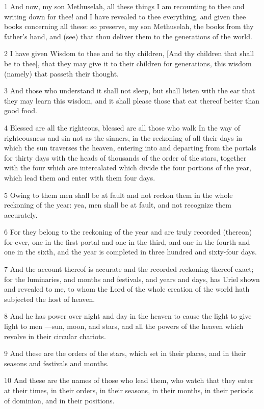\par 1 And now, my son Methuselah, all these things I am recounting to thee and writing down for thee! and I have revealed to thee everything, and given thee books concerning all these: so preserve, my son Methuselah, the books from thy father's hand, and (see) that thou deliver them to the generations of the world.
\par 2 I have given Wisdom to thee and to thy children, [And thy children that shall be to thee], that they may give it to their children for generations, this wisdom (namely) that passeth their thought.
\par 3 And those who understand it shall not sleep, but shall listen with the ear that they may learn this wisdom, and it shall please those that eat thereof better than good food.
\par 4 Blessed are all the righteous, blessed are all those who walk In the way of righteousness and sin not as the sinners, in the reckoning of all their days in which the sun traverses the heaven, entering into and departing from the portals for thirty days with the heads of thousands of the order of the stars, together with the four which are intercalated which divide the four portions of the year, which lead them and enter with them four days.
\par 5 Owing to them men shall be at fault and not reckon them in the whole reckoning of the year: yea, men shall be at fault, and not recognize them accurately.
\par 6 For they belong to the reckoning of the year and are truly recorded (thereon) for ever, one in the first portal and one in the third, and one in the fourth and one in the sixth, and the year is completed in three hundred and sixty-four days.
\par 7 And the account thereof is accurate and the recorded reckoning thereof exact; for the luminaries, and months and festivals, and years and days, has Uriel shown and revealed to me, to whom the Lord of the whole creation of the world hath subjected the host of heaven.
\par 8 And he has power over night and day in the heaven to cause the light to give light to men —sun, moon, and stars, and all the powers of the heaven which revolve in their circular chariots.
\par 9 And these are the orders of the stars, which set in their places, and in their seasons and festivals and months.
\par 10 And these are the names of those who lead them, who watch that they enter at their times, in their orders, in their seasons, in their months, in their periods of dominion, and in their positions.
